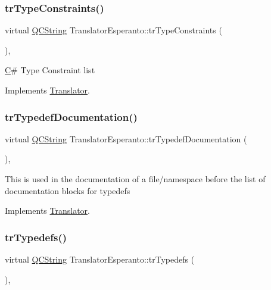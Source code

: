 \subsubsection{\texorpdfstring{trTypeConstraints()}{trTypeConstraints()}}
{\footnotesize\ttfamily virtual \mbox{\hyperlink{class_q_c_string}{Q\+C\+String}} Translator\+Esperanto\+::tr\+Type\+Constraints (\begin{DoxyParamCaption}{ }\end{DoxyParamCaption})\hspace{0.3cm}{\ttfamily [inline]}, {\ttfamily [virtual]}}

\mbox{\hyperlink{class_c}{C}}\# Type Constraint list 

Implements \mbox{\hyperlink{class_translator}{Translator}}.

\mbox{\label{class_translator_esperanto_a1f0f386b78a28105ea308692ae3b68e9}} 
\subsubsection{\texorpdfstring{trTypedefDocumentation()}{trTypedefDocumentation()}}
{\footnotesize\ttfamily virtual \mbox{\hyperlink{class_q_c_string}{Q\+C\+String}} Translator\+Esperanto\+::tr\+Typedef\+Documentation (\begin{DoxyParamCaption}{ }\end{DoxyParamCaption})\hspace{0.3cm}{\ttfamily [inline]}, {\ttfamily [virtual]}}

This is used in the documentation of a file/namespace before the list of documentation blocks for typedefs 

Implements \mbox{\hyperlink{class_translator}{Translator}}.

\mbox{\label{class_translator_esperanto_ad11700d76f090f935aefb8a68d261bdb}} 
\subsubsection{\texorpdfstring{trTypedefs()}{trTypedefs()}}
{\footnotesize\ttfamily virtual \mbox{\hyperlink{class_q_c_string}{Q\+C\+String}} Translator\+Esperanto\+::tr\+Typedefs (\begin{DoxyParamCaption}{ }\end{DoxyParamCaption})\hspace{0.3cm}{\ttfamily [inline]}, {\ttfamily [virtual]}}

